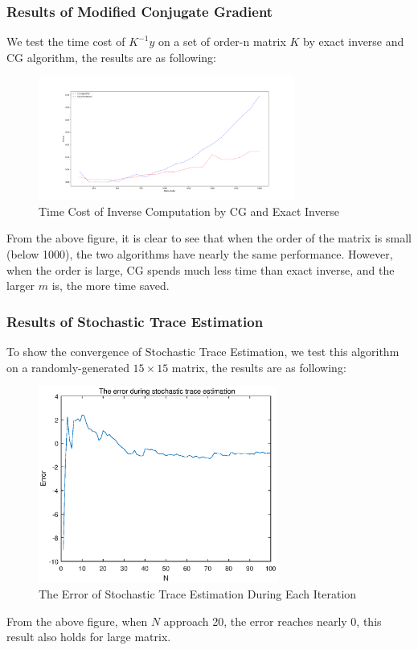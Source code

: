 \documentclass{article}
\begin{document}
\subsubsection{Results of Modified Conjugate Gradient}
We test the time cost of $K^{-1}y$ on a set of order-n matrix $K$ by exact inverse and CG algorithm, the results are as following:
  \begin{figure}[H]
	\begin{center}
		\includegraphics[width=0.75\textwidth]{CG_time}
	\end{center}
	\caption{Time Cost of Inverse Computation by CG and Exact Inverse}
	\label{fig7}
\end{figure}
From the above figure, it is clear to see that when the order of the matrix is small (below 1000), the two algorithms have nearly the same performance. However, when the order is large, CG spends much less time than exact inverse, and the larger $m$ is, the more time saved.

\subsubsection{Results of Stochastic Trace Estimation}
To show the convergence of Stochastic Trace Estimation, we test this algorithm on a randomly-generated $15\times15$ matrix, the results are as following:
  \begin{figure}[H]
	\begin{center}
		\includegraphics[width=0.7\textwidth]{error}
	\end{center}
	\caption{The Error of Stochastic Trace Estimation During Each Iteration}
	\label{fig8}
\end{figure}
From the above figure, when $N$ approach 20, the error reaches nearly $0$, this result also holds for large matrix.
\end{document}

